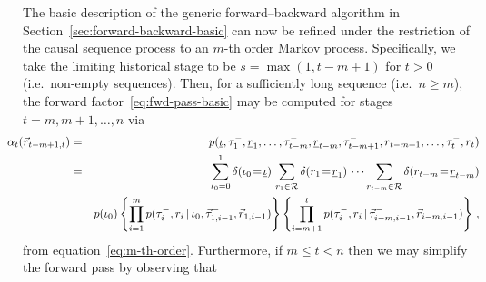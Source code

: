 \documentclass[a4paper]{article}
\newcommand{\ui}{\underline{\iota}}
\newcommand{\ur}{\underline{r}}
\newcommand{\vr}{\vec{r}}
\newcommand{\tm}{\tau^{-}}
\begin{document}
The basic description of the generic forward--backward algorithm in Section~\ref{sec:forward-backward-basic}
can now be refined under the restriction of the causal sequence process to an $m$-th order Markov process.
Specifically, we take the limiting historical stage to be $s=\max(1, t-m+1)$ for $t>0$ (i.e.\ non-empty sequences).
Then, for a sufficiently long sequence (i.e.\ $n\ge m$), the forward factor~\eqref{eq:fwd-pass-basic} may be
computed for stages $t=m,m+1,\ldots,n$ via
\begin{eqnarray}
\hspace*{-5mm}
\alpha_t(\vr_{t-m+1,t}) & = & p(\ui,\tm_1,\ur_1,\ldots,\tm_{t-m},\ur_{t-m},\tm_{t-m+1},r_{t-m+1},\ldots,\tm_t,r_t)
\nonumber\\& = &
\sum_{\iota_0=0}^{1}\delta(\iota_0\!=\!\ui)\,
\sum_{r_1\in{\cal R}} \delta(r_1\!=\!\ur_1)\,
\cdots
\sum_{r_{t-m}\in{\cal R}} \delta(r_{t-m}\!=\!\ur_{t-m})
\nonumber\\&&
p(\iota_0)\left\{\prod_{i=1}^{m}p(\tm_i,r_i\,|\,\iota_0,\vec{\tau}^-_{1,i-1},\vr_{1,i-1})\right\}
\left\{\prod_{i=m+1}^{t}p(\tm_i,r_i\,|\,\vec{\tau}^-_{i-m,i-1},\vr_{i-m,i-1})\right\}\,,
\label{eq:fwd-pass-m}
\end{eqnarray}
from equation~\eqref{eq:m-th-order}. 
Furthermore, if $m\le t<n$ then we may simplify the forward pass by observing that
\end{document}
